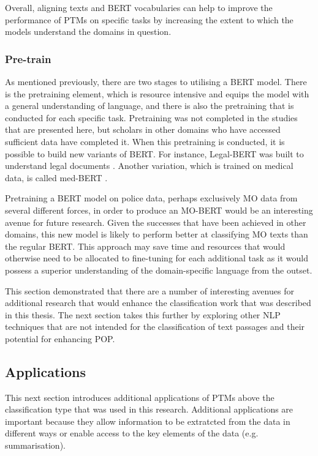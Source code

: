 Overall, aligning texts and BERT vocabularies can help to improve the performance of PTMs on specific tasks by increasing the extent to which the models understand the domains in question.

\subsubsection{Pre-train} As mentioned previously, there are two stages to utilising a BERT model. There is the pretraining element, which is resource intensive and equips the model with a general understanding of language, and there is also the pretraining that is conducted for each specific task. Pretraining was not completed in the studies that are presented here, but scholars in other domains who have accessed sufficient data have completed it. When this pretraining is conducted, it is possible to build new variants of BERT. For instance, Legal-BERT was built to understand legal documents \parencite{legal_bert}. Another variation, which is trained on medical data, is called med-BERT \parencite{med_bert}.

Pretraining a BERT model on police data, perhaps exclusively MO data from several different forces, in order to produce an MO-BERT would be an interesting avenue for future research. Given the successes that have been achieved in other domains, this new model is likely to perform better at classifying MO texts than the regular BERT. This approach may save time and resources that would otherwise need to be allocated to fine-tuning for each additional task as it would possess a superior understanding of the domain-specific language from the outset.

This section demonstrated that there are a number of interesting avenues for additional research that would enhance the classification work that was described in this thesis. The next section takes this further by exploring other NLP techniques that are not intended for the classification of text passages and their potential for enhancing POP.

\subsection{Applications} This next section introduces additional applications of PTMs above the classification type that was used in this research. Additional applications are important because they allow information to be extratcted from the data in different ways or enable access to the key elements of the data (e.g. summarisation).

